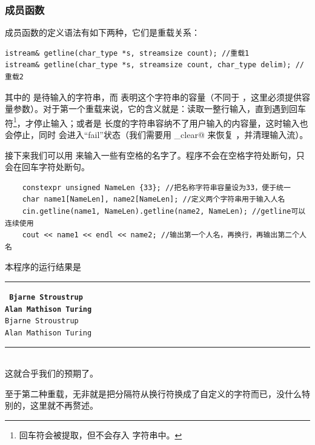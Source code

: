 \subsubsection*{\lstinline@getline@ 成员函数}
\lstinline@getline@ 成员函数的定义语法有如下两种，它们是重载关系：
\begin{lstlisting}
istream& getline(char_type *s, streamsize count); //重载1
istream& getline(char_type *s, streamsize count, char_type delim); //重载2
\end{lstlisting}
其中的 \lstinline@s@ 是待输入的字符串，而 \lstinline@count@ 表明这个字符串的容量（不同于 \lstinline@strcpy@，这里必须提供容量参数）。对于第一个重载来说，它的含义就是：读取一整行输入，直到遇到回车符\footnote{回车符会被提取，但不会存入 \lstinline@s@ 字符串中。}，才停止输入；或者是 \lstinline@count@ 长度的字符串容纳不了用户输入的内容量，这时输入也会停止，同时 \lstinline@cin@ 会进入``fail''状态（我们需要用 \lstinline@input_clear@ 来恢复 \lstinline@cin@，并清理输入流）。\par
接下来我们可以用 \lstinline@getline@ 来输入一些有空格的名字了。程序不会在空格字符处断句，只会在回车字符处断句。\par
\begin{lstlisting}
    constexpr unsigned NameLen {33}; //把名称字符串容量设为33，便于统一
    char name1[NameLen], name2[NameLen]; //定义两个字符串用于输入人名
    cin.getline(name1, NameLen).getline(name2, NameLen); //getline可以连续使用
    cout << name1 << endl << name2; //输出第一个人名，再换行，再输出第二个人名
\end{lstlisting}
本程序的运行结果是\\\noindent\rule{\linewidth}{.2pt}\texttt{
\textbf{Bjarne Stroustrup\\
Alan Mathison Turing}\\
Bjarne Stroustrup\\
Alan Mathison Turing
}\\\noindent\rule{\linewidth}{.2pt}\\
这就合乎我们的预期了。\par
至于第二种重载，无非就是把分隔符从换行符换成了自定义的字符而已，没什么特别的，这里就不再赘述。\par
